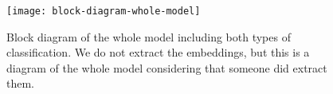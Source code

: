 	\begin{figure}[H]
		\centering
		\captionsetup{justification=centering}
		\texttt{[image: block-diagram-whole-model]}
		\caption{Block diagram of the whole model including both types of classification. We do not extract the embeddings, but this is a diagram of the whole model considering that someone did extract them.}
		\label{fig:mesh54}
	\end{figure} 




















